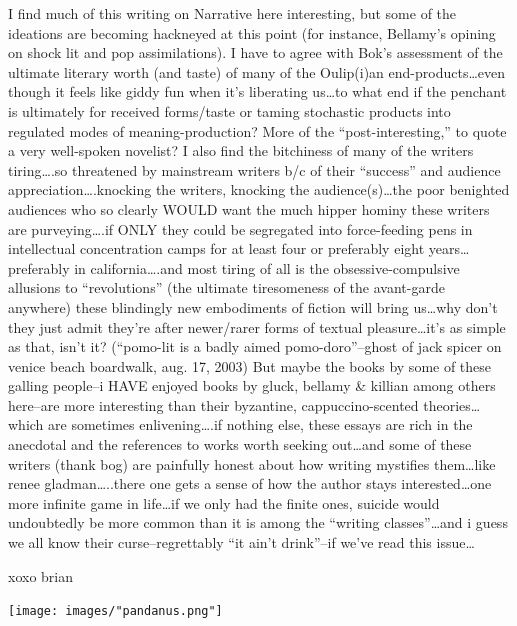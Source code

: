 \documentclass[
]{memoir}
\begin{document}
I find much of this writing on Narrative here interesting, but some of
the ideations are becoming hackneyed at this point (for instance,
Bellamy's opining on shock lit and pop assimilations). I have to agree
with Bok's assessment of the ultimate literary worth (and taste) of many
of the Oulip(i)an end-products\ldots{}even though it feels like giddy
fun when it's liberating us\ldots{}to what end if the penchant is
ultimately for received forms/taste or taming stochastic products into
regulated modes of meaning-production? More of the ``post-interesting,''
to quote a very well-spoken novelist? I also find the bitchiness of many
of the writers tiring\ldots{}.so threatened by mainstream writers b/c of
their ``success'' and audience appreciation\ldots{}.knocking the
writers, knocking the audience(s)\ldots{}the poor benighted audiences
who so clearly WOULD want the much hipper hominy these writers are
purveying\ldots{}.if ONLY they could be segregated into force-feeding
pens in intellectual concentration camps for at least four or preferably
eight years\ldots{}preferably in california\ldots{}.and most tiring of
all is the obsessive-compulsive allusions to ``revolutions'' (the
ultimate tiresomeness of the avant-garde anywhere) these blindingly new
embodiments of fiction will bring us\ldots{}why don't they just admit
they're after newer/rarer forms of textual pleasure\ldots{}it's as
simple as that, isn't it? (``pomo-lit is a badly aimed
pomo-doro''--ghost of jack spicer on venice beach boardwalk, aug. 17,
2003) But maybe the books by some of these galling people--i HAVE
enjoyed books by gluck, bellamy \& killian among others here--are more
interesting than their byzantine, cappuccino-scented
theories\ldots{}which are sometimes enlivening\ldots{}.if nothing else,
these essays are rich in the anecdotal and the references to works worth
seeking out\ldots{}and some of these writers (thank bog) are painfully
honest about how writing mystifies them\ldots{}like renee
gladman\ldots{}..there one gets a sense of how the author stays
interested\ldots{}one more infinite game in life\ldots{}if we only had
the finite ones, suicide would undoubtedly be more common than it is
among the ``writing classes''\ldots{}and i guess we all know their
curse--regrettably ``it ain't drink''--if we've read this issue\ldots{}

xoxo brian

\begin{center}\texttt{[image: images/"pandanus.png"]}\end{center}
\end{document}
